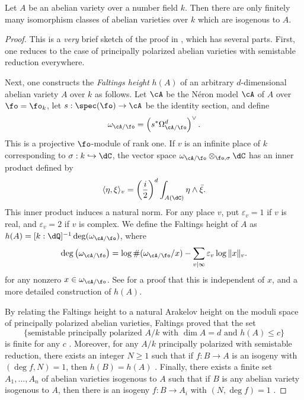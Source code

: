 \begin{theorem}[Finiteness I]\label{thm:finiteness-I}
Let $A$ be an abelian variety over a number field $k$. Then there are only 
finitely many isomorphism classes of abelian varieties over $k$ which are 
isogenous to $A$. 
\end{theorem}
\begin{proof}
This is a \emph{very} brief sketch of the proof in \cite[V.3]{fa84}, which 
has several parts. First, one reduces to the case of principally polarized 
abelian varieties with semistable reduction everywhere. 

Next, one constructs the \emph{Faltings height} $h(A)$ of an arbitrary 
$d$-dimensional abelian variety $A$ over $k$ as follows. 
Let $\cA$ be the N\'eron model $\cA$ of $A$ over $\fo=\fo_k$, let 
$s:\spec(\fo) \to \cA$ be the identity section, and define 
\[
  \omega_{\cA/\fo} = \left(s^\ast \Omega_{\cA/\fo}^d\right)^\vee \text{.}
\]
This is a projective $\fo$-module of rank one. If $v$ is an infinite place of 
$k$ corresponding to $\sigma:k\hookrightarrow \dC$, the vector space 
$\omega_{\cA/\fo}\otimes_{\fo,\sigma} \dC$ has an inner product defined by 
\[
  \langle \eta,\xi\rangle_v = \left(\frac i 2\right)^d \int_{A(\dC)} \eta \wedge \bar \xi \text{.}
\]
This inner product induces a natural norm. For any place $v$, put 
$\varepsilon_v=1$ if $v$ is real, and $\varepsilon_v=2$ if $v$ is complex. 
We define the Faltings height of $A$ as  
$h(A)=[k:\dQ]^{-1} \deg(\omega_{\cA/\fo})$, where 
\[
  \deg\left(\omega_{\cA/\fo}\right) = \log \#(\omega_{\cA/\fo}/x) - \sum_{v\mid \infty} \varepsilon_v \log \|x\|_v \text{.}
\]
for any nonzero $x\in \omega_{\cA/\fo}$. See \cite[VI.6]{mi-av} for a proof 
that this is independent of $x$, and a more detailed construction of $h(A)$. 

By relating the Faltings height to a natural Arakelov height on the moduli 
space of principally polarized abelian varieties, Faltings proved that the set 
\[
  \{\text{semistable principally polarized $A/k$ with $\dim A=d$ and $h(A)\leqslant c$}\}
\]
is finite for any $c$ \cite[II.4.3]{fa84}. Moreover, for any $A/k$ principally 
polarized with semistable reduction, there exists an integer $N\geqslant 1$ 
such that if $f:B\to A$ is an isogeny with $(\deg f,N)=1$, then $h(B)=h(A)$
\cite[V.3.5]{fa84}. Finally, there exists a finite set $A_1,\dots,A_n$ of 
abelian varieties isogenous to $A$ such that if $B$ is any abelian variety 
isogenous to $A$, then there is an isogeny $f:B\to A_i$ with 
$(N,\deg f)=1$ \cite[V.3.4]{fa84}. 
\end{proof}

